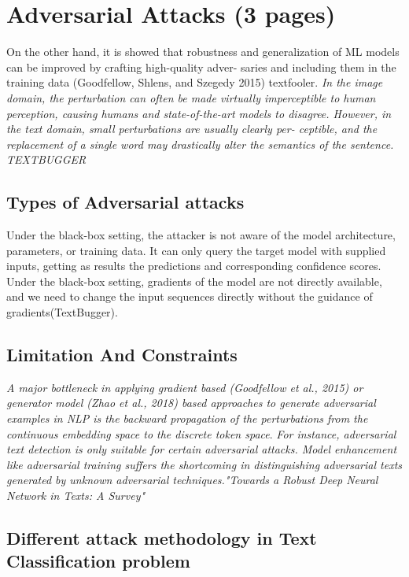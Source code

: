 \documentclass[%
	BCOR=8mm, %
	DIV=12, 
	toc=bibliography, %
	toc=listof, %
	oneside, %
	egregdoesnotlikesansseriftitles, %
	]{scrbook}
\begin{document}
\section{Adversarial Attacks (3 pages)}
On the other hand, it is showed that robustness and generalization of ML models can be improved by crafting high-quality adver- saries and including them in the training data (Goodfellow, Shlens, and Szegedy 2015) textfooler. 
\textit{In the image domain, the perturbation can often be made virtually imperceptible to human perception, causing humans and state-of-the-art models to disagree. However, in the text domain, small perturbations are usually clearly per- ceptible, and the replacement of a single word may drastically alter the semantics of the sentence. TEXTBUGGER }
\subsection{Types of Adversarial attacks}
Under the black-box setting, the attacker is not aware of the model architecture, parameters, or training data. It can only query the target model with supplied inputs, getting as results the predictions and corresponding confidence scores. Under the black-box setting, gradients of the model are not directly available, and we need to change the input sequences directly without the guidance of gradients(TextBugger). 

\subsection{Limitation And Constraints}
\textit{A major bottleneck in applying gradient based (Goodfellow et al., 2015) or generator model (Zhao et al., 2018) based approaches to generate adversarial examples in NLP is the backward propagation of the perturbations from the continuous embedding space to the discrete token space}.\cite{garg_bae_2020}
\textit{For instance, adversarial text detection is only suitable for certain adversarial attacks. Model enhancement like adversarial training suffers the shortcoming in distinguishing adversarial texts generated by unknown adversarial techniques."Towards a Robust Deep Neural Network in Texts: A Survey\(\)"} 
\subsection{Different attack methodology in Text Classification problem}
\end{document}

